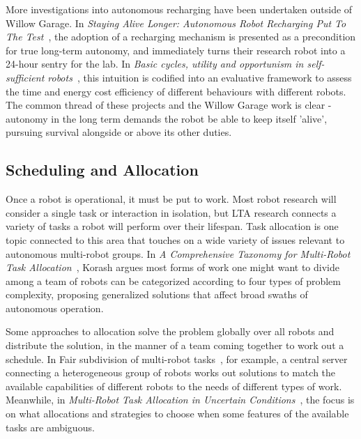 \documentclass{sfuthesis}
\begin{document}
More investigations into autonomous recharging have been undertaken outside of Willow Garage. In \textit{Staying Alive Longer: Autonomous Robot Recharging Put To The Test}~\cite{silverman2003staying}, the adoption of a recharging mechanism is presented as a precondition for true long-term autonomy, and immediately turns their research robot into a 24-hour sentry for the lab. In \textit{Basic cycles, utility and opportunism in self-sufficient robots}~\cite{mcfarland1997basic}, this intuition is codified into an evaluative framework to assess the time and energy cost efficiency of different behaviours with different robots. The common thread of these projects and the Willow Garage work is clear - autonomy in the long term demands the robot be able to keep itself 'alive', pursuing survival alongside or above its other duties. 





\subsection{Scheduling and Allocation}


Once a robot is operational, it must be put to work. Most robot research will consider a single task or interaction in isolation, but LTA research connects a variety of tasks a robot will perform over their lifespan. Task allocation is one topic connected to this area that touches on a wide variety of issues relevant to autonomous multi-robot groups. In \textit{A Comprehensive Taxonomy for Multi-Robot Task Allocation}~\cite{korsah2013comprehensive}, Korash argues most forms of work one might want to divide among a team of robots can be categorized according to four types of problem complexity, proposing generalized solutions that affect broad swaths of autonomous operation.

Some approaches to allocation solve the problem globally over all robots and distribute the solution, in the manner of a team coming together to work out a schedule. In {Fair subdivision of multi-robot tasks}~\cite{higuera2013fair}, for example, a central server connecting a heterogeneous group of robots works out solutions to match the available capabilities of different robots to the needs of different types of work. Meanwhile, in \textit{Multi-Robot Task Allocation in Uncertain Conditions}~\cite{gerkey2003multi}, the focus is on what allocations and strategies to choose when some features of the available tasks are ambiguous.
\end{document}
